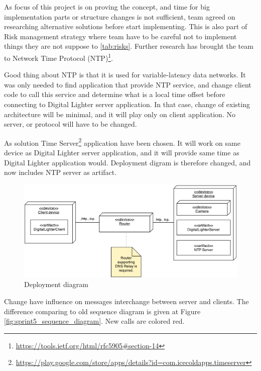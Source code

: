 As focus of this project is on proving the concept, and time for big implementation parts or structure changes is not sufficient, team agreed on researching alternative solutions before start implementing. This is also part of Risk management strategy where team have to be careful not to implement things they are not suppose to \ref{tab:risks}. Further research has brought the team to Network Time Protocol (NTP)\footnote{\url{https://tools.ietf.org/html/rfc5905\#section-14}}.

Good thing about NTP is that it is used for variable-latency data networks. It was only needed to find application that provide NTP service, and change client code to call this service and determine what is a local time offset before connecting to Digital Lighter server application. In that case, change of existing architecture will be minimal, and it will play only on client application. No server, or protocol will have to be changed.

As solution Time Server\footnote{\url{https://play.google.com/store/apps/details?id=com.icecoldapps.timeserver}} application have been chosen. It will work on same device as Digital Lighter server application, and it will provide same time as Digital Lighter application would. Deployment digram is therefore changed, and now includes NTP server as artifact. 

\begin{figure}[H]
	\centering
		\includegraphics[width=15cm]{images/deployment-diagram-sprint5}
	\caption{Deployment diagram}
	\label{fig:sprint5_deployment_diagram}
\end{figure}

Change have influence on messages interchange between server and clients. The difference comparing to old sequence diagram is given at Figure \ref{fig:sprint5_sequence_diagram}. New calls are colored red. 

